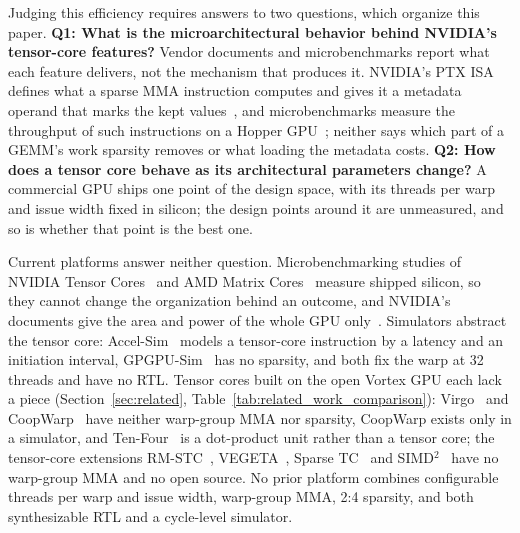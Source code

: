 Judging this efficiency requires answers to two questions, which organize this paper. \textbf{Q1: What is the microarchitectural behavior behind NVIDIA's tensor-core features?} Vendor documents and microbenchmarks report what each feature delivers, not the mechanism that produces it. NVIDIA's PTX ISA defines what a sparse MMA instruction computes and gives it a metadata operand that marks the kept values~\cite{nvidia2026ptxisa}, and microbenchmarks measure the throughput of such instructions on a Hopper GPU~\cite{luo2025dissectingnvidiahopperarchitecture}; neither says which part of a GEMM's work sparsity removes or what loading the metadata costs. \textbf{Q2: How does a tensor core behave as its architectural parameters change?} A commercial GPU ships one point of the design space, with its threads per warp and issue width fixed in silicon; the design points around it are unmeasured, and so is whether that point is the best one.

Current platforms answer neither question. Microbenchmarking studies of NVIDIA Tensor Cores~\cite{jia2018dissectingnvidiavoltagpu, raihan2019modeling, markidis2018tensorcore, martineau2019v100, jia2019dissectingnvidiaturingt4, yan2020demystifying, 9926299, 9931992, 10579250, luo2025dissectingnvidiahopperarchitecture, 10.1145/3725843.3756041, 11575375} and AMD Matrix Cores~\cite{10590025, kurzynski2025mfma, jarmusch2026microbenchmark} measure shipped silicon, so they cannot change the organization behind an outcome, and NVIDIA's documents give the area and power of the whole GPU only~\cite{nvidia2017volta, nvidia2020ampere, nvidia2022hopper, nvidia2024blackwell}. Simulators abstract the tensor core: Accel-Sim~\cite{accel-sim} models a tensor-core instruction by a latency and an initiation interval, GPGPU-Sim~\cite{raihan2019modeling} has no sparsity, and both fix the warp at 32 threads and have no RTL. Tensor cores built on the open Vortex GPU each lack a piece (Section~\ref{sec:related}, Table~\ref{tab:related_work_comparison}): Virgo~\cite{kim2025virgo} and CoopWarp~\cite{nada2025cooperative} have neither warp-group MMA nor sparsity, CoopWarp exists only in a simulator, and Ten-Four~\cite{rout2026tenfouropensourcefuseddot} is a dot-product unit rather than a tensor core; the tensor-core extensions RM-STC~\cite{huang2023rmstc}, VEGETA~\cite{jeong2023vegeta}, Sparse TC~\cite{zhu2019sparsetensorcore} and SIMD$^2$~\cite{zhang2022simd2} have no warp-group MMA and no open source. No prior platform combines configurable threads per warp and issue width, warp-group MMA, 2:4 sparsity, and both synthesizable RTL and a cycle-level simulator.

